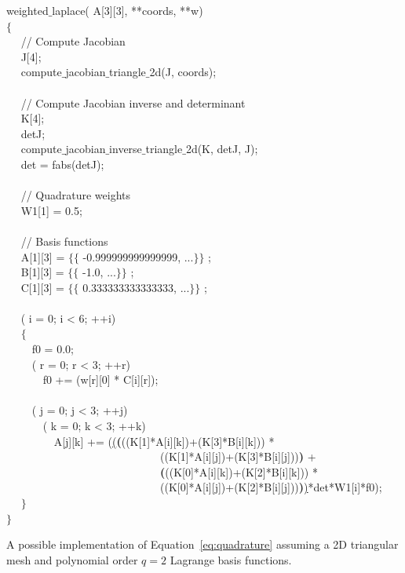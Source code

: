 \begin{algorithm}[t]
\scriptsize
{}

 weighted$\_$laplace( A[3][3],  **coords,  **w) \\
$\lbrace$ \\
~~  // Compute Jacobian \\
~~   J[4]; \\
~~  compute$\_$jacobian$\_$triangle$\_$2d(J, coords); \\
~~\\
~~  // Compute Jacobian inverse and determinant \\
~~   K[4]; \\
~~   detJ; \\
~~  compute$\_$jacobian$\_$inverse$\_$triangle$\_$2d(K, detJ, J); \\
~~   det = fabs(detJ); \\
~~\\
~~  // Quadrature weights \\
~~   W1[1] = {0.5}; \\
~~\\
~~  // Basis functions \\
~~   A[1][3] = $\lbrace\lbrace$ -0.999999999999999, ...$\rbrace\rbrace$ ;\\
~~   B[1][3] = $\lbrace\lbrace$ -1.0, ...$\rbrace\rbrace$ ;\\
~~   C[1][3] = $\lbrace\lbrace$ 0.333333333333333, ...$\rbrace\rbrace$ ;\\
~~\\
~~   ( i = 0; i < 6; ++i)\\
~~  $\lbrace$\\
~~~~   f0  = 0.0;\\
~~~~   ( r  = 0; r < 3; ++r)\\
~~~~~~  f0 += (w[r][0] * C[i][r]);\\
~~\\
~~~~   ( j = 0; j < 3; ++j)\\
~~~~~~     ( k = 0; k < 3; ++k)\\
~~~~~~~~      A[j][k] += (\underline{(}\textbf{(}((K[1]*A[i][k])+(K[3]*B[i][k])) * \\
~~~~~~~~~~~~~~~~~~~~~~~~~~~~((K[1]*A[i][j])+(K[3]*B[i][j]))\textbf{)} + \\
~~~~~~~~~~~~~~~~~~~~~~~~~~~~\textbf{(}((K[0]*A[i][k])+(K[2]*B[i][k])) * \\
~~~~~~~~~~~~~~~~~~~~~~~~~~~~((K[0]*A[i][j])+(K[2]*B[i][j]))\textbf{)}\underline{)}*det*W1[i]*f0);\\
~~  $\rbrace$\\
$\rbrace$
\caption{A possible implementation of Equation~\ref{eq:quadrature} assuming a 2D triangular mesh and polynomial order $q=2$ Lagrange basis functions.}
\label{code:weighted-laplace}
\end{algorithm}

